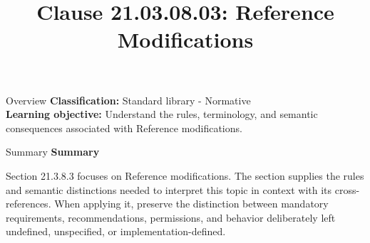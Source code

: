 \documentclass[10pt,letterpaper]{article}
\title{Clause 21.03.08.03: Reference Modifications}
\author{}
\date{}
\begin{document}
\maketitle
\begin{CornellOverviewBox}{Overview}
\textbf{Classification:} Standard library - Normative\\[2pt]
\textbf{Learning objective:} Understand the rules, terminology, and semantic consequences associated with Reference modifications.
\end{CornellOverviewBox}\begin{CornellSummaryBox}{Summary}
{\sffamily\bfseries\color{Accent} Summary}\par\vspace{3pt}Section 21.3.8.3 focuses on Reference modifications. The section supplies the rules and semantic distinctions needed to interpret this topic in context with its cross-references. When applying it, preserve the distinction between mandatory requirements, recommendations, permissions, and behavior deliberately left undefined, unspecified, or implementation-defined.
\end{CornellSummaryBox}
\end{document}
